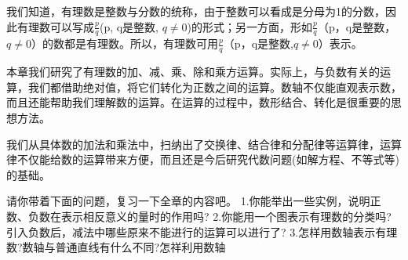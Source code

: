 \documentclass{article}
\begin{document}
\begin{article}
我们知道，有理数是整数与分数的统称，由于整数可以看成是分母为1的分数，因此有理数可以写成$\frac{p}{q}$(p, q是整数, $q\neq 0$)的形式；另一方面，形如$\frac{p}{q}$（p，q是整数，$q\neq0$）的数都是有理数。所以，有理数可用$\frac{p}{q}$（p，q是整数,$q \neq 0$）表示。

本章我们研究了有理数的加、减、乘、除和乘方运算。实际上，与负数有关的运算，我们都借助绝对值，将它们转化为正数之间的运算。数轴不仅能直观表示数，而且还能帮助我们理解数的运算。在运算的过程中，数形结合、转化是很重要的思想方法。

我们从具体数的加法和乘法中，扫纳出了交换律、结合律和分配律等运算律，运算律不仅能给数的运算带来方便，而且还是今后研究代数问题(如解方程、不等式等)的基础。

    请你带着下面的问题，复习一下全章的内容吧。
    1.你能举出一些实例，说明正数、负数在表示相反意义的量时的作用吗?
    2.你能用一个图表示有理数的分类吗?引入负数后，减法中哪些原来不能进行的运算可以进行了?
    3.怎样用数轴表示有理数?数轴与普通直线有什么不同?怎祥利用数轴

\end{article}
\end{document}
